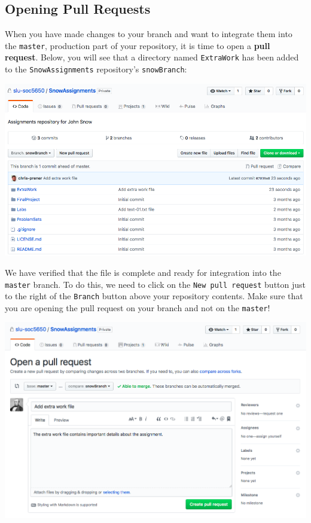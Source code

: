 \documentclass[]{book}
\theoremstyle{definition}
\theoremstyle{definition}
\theoremstyle{remark}
\begin{document}
\subsection{Opening Pull Requests}\label{opening-pull-requests}

When you have made changes to your branch and want to integrate them
into the \texttt{master}, production part of your repository, it is time
to open a \textbf{pull request}. Below, you will see that a directory
named \texttt{ExtraWork} has been added to the \texttt{SnowAssignments}
repository's \texttt{snowBranch}:

\includegraphics[width=1\linewidth]{images/branch4}

We have verified that the file is complete and ready for integration
into the \texttt{master} branch. To do this, we need to click on the
\texttt{New\ pull\ request} button just to the right of the
\texttt{Branch} button above your repository contents. Make sure that
you are opening the pull request on your branch and not on the
\texttt{master}!

\includegraphics[width=1\linewidth]{images/branch5}
\end{document}
